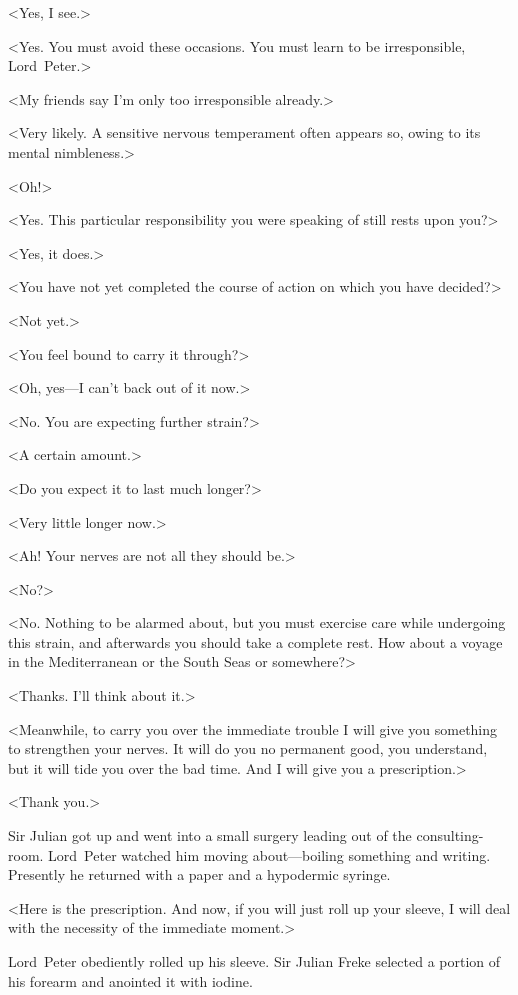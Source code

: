 <Yes, I see.>

<Yes. You must avoid these occasions. You must learn to be irresponsible, Lord~Peter.>

<My friends say I'm only too irresponsible already.>

<Very likely. A sensitive nervous temperament often appears so, owing to its mental nimbleness.>

<Oh!>

<Yes. This particular responsibility you were speaking of still rests upon you?>

<Yes, it does.>

<You have not yet completed the course of action on which you have decided?>

<Not yet.>

<You feel bound to carry it through?>

<Oh, yes—I can't back out of it now.>

<No. You are expecting further strain?>

<A certain amount.>

<Do you expect it to last much longer?>

<Very little longer now.>

<Ah! Your nerves are not all they should be.>

<No?>

<No. Nothing to be alarmed about, but you must exercise care while undergoing this strain, and afterwards you should take a complete rest. How about a voyage in the Mediterranean or the South Seas or somewhere?>

<Thanks. I'll think about it.>

<Meanwhile, to carry you over the immediate trouble I will give you something to strengthen your nerves. It will do you no permanent good, you understand, but it will tide you over the bad time. And I will give you a prescription.>

<Thank you.>

Sir Julian got up and went into a small surgery leading out of the consulting-room. Lord~Peter watched him moving about—boiling something and writing. Presently he returned with a paper and a hypodermic syringe.

<Here is the prescription. And now, if you will just roll up your sleeve, I will deal with the necessity of the immediate moment.>

Lord~Peter obediently rolled up his sleeve. Sir Julian Freke selected a portion of his forearm and anointed it with iodine.

